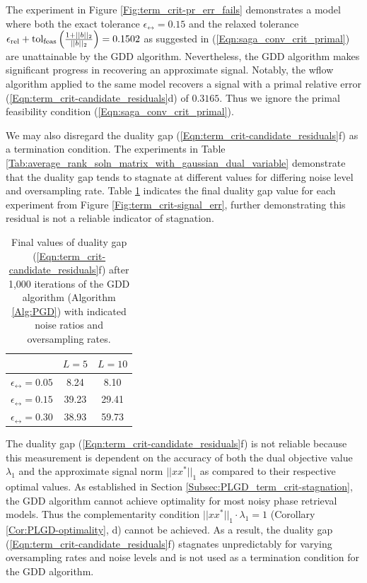 
The experiment in Figure \ref{Fig:term_crit-pr_err_fails} demonstrates a model where both the exact tolerance $\epsilon_\rel = 0.15$ and the relaxed tolerance $ \epsilon_{\textnormal{rel}} + \textnormal{tol}_\textnormal{feas} \left(\frac{1 + ||b||_2}{||b||_2}\right) =0.1502$ as suggested in (\ref{Eqn:saga_conv_crit_primal}) are unattainable by the GDD algorithm.  Nevertheless, the GDD algorithm makes significant progress in recovering an approximate signal.  Notably, the wflow algorithm applied to the same model recovers a signal with a primal relative error (\ref{Eqn:term_crit-candidate_residuals}d) of $0.3165$.  Thus we ignore the primal feasibility condition (\ref{Eqn:saga_conv_crit_primal}).


We may also disregard the duality gap (\ref{Eqn:term_crit-candidate_residuals}f) as a termination condition.  The experiments in Table \ref{Tab:average_rank_soln_matrix_with_gaussian_dual_variable} demonstrate that the duality gap tends to stagnate at different values for differing noise level and oversampling rate.  Table \ref{Tab:term_crit-duality_gap_stagnates} indicates the final duality gap value for each experiment from Figure \ref{Fig:term_crit-signal_err}, further demonstrating this residual is not a reliable indicator of stagnation.

\begin{table}[H]
\centering
\begin{tabular}{ |c|c|c| }
\hline
&	$L = 5$
	&	$L = 10$	\\
 \hline
$\epsilon_\rel = 0.05$
&     8.24 &   8.10 		\\
 \hline
$\epsilon_\rel = 0.15$
&  39.23 &  29.41 	\\
 \hline
$\epsilon_\rel = 0.30$
&  38.93 &  59.73	\\
 \hline
\end{tabular}
\vspace{0.5cm}
	\caption{Final values of duality gap (\ref{Eqn:term_crit-candidate_residuals}f) after 1,000 iterations of the GDD algorithm (Algorithm \ref{Alg:PGD}) with indicated noise ratios and oversampling rates.}
	\label{Tab:term_crit-duality_gap_stagnates}
\end{table}

The duality gap (\ref{Eqn:term_crit-candidate_residuals}f) is not reliable because this measurement is dependent on the accuracy of both the dual objective value $\lambda_1$ and the approximate signal norm $||xx^*||_1$ as compared to their respective optimal values.  As established in Section \ref{Subsec:PLGD_term_crit-stagnation}, the GDD algorithm cannot achieve optimality for most noisy phase retrieval models.  Thus the complementarity condition $||xx^*||_1 \cdot \lambda_1 = 1$ (Corollary \ref{Cor:PLGD-optimality}, d) cannot be achieved.  As a result, the duality gap (\ref{Eqn:term_crit-candidate_residuals}f) stagnates unpredictably for varying oversampling rates and noise levels and is not used as a termination condition for the GDD algorithm.



